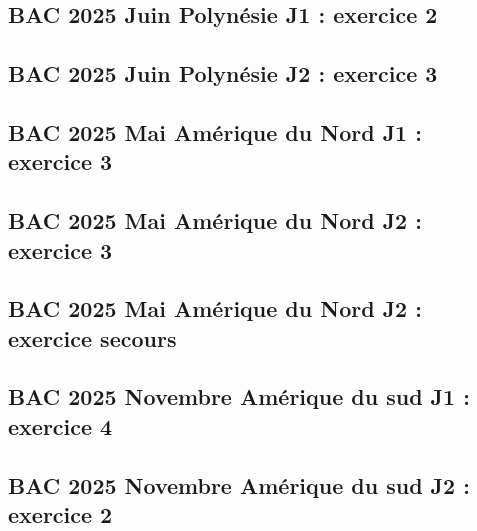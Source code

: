 \documentclass[lang=fr,edition=teacher,layout=sheet]{mxbook}
\begin{document}
\begingroup\endgroup
\par\bigskip
{}\subsection*{BAC 2025 Juin Polynésie J1 : exercice 2}
\begingroup\endgroup
\par\bigskip
{}\subsection*{BAC 2025 Juin Polynésie J2 : exercice 3}
\begingroup\endgroup
\par\bigskip
{}\subsection*{BAC 2025 Mai Amérique du Nord J1 : exercice 3}
\begingroup\endgroup
\par\bigskip
{}\subsection*{BAC 2025 Mai Amérique du Nord J2 : exercice 3}
\begingroup\endgroup
\par\bigskip
{}\subsection*{BAC 2025 Mai Amérique du Nord J2 : exercice secours}
\begingroup\endgroup
\par\bigskip
{}\subsection*{BAC 2025 Novembre Amérique du sud J1 : exercice 4}
\begingroup\endgroup
\par\bigskip
{}\subsection*{BAC 2025 Novembre Amérique du sud J2 : exercice 2}
\end{document}
